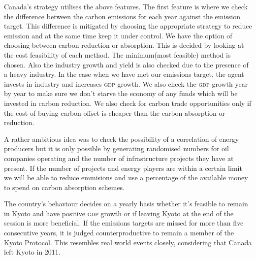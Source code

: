 Canada's strategy utilises the above features. The first feature is where we check the difference between the carbon emissions for each year against the emission target. This difference is mitigated by choosing the appropriate strategy to reduce emission and at the same time keep it under control. We have the option of choosing between carbon reduction or absorption. This is decided by looking at the cost feasibility of each method. The minimum(most feasible) method is chosen. Also the industry growth and yield is also checked due to the presence of a heavy industry. In the case when we have met our emissions target, the agent invests in industry and increases \textsc{gdp} growth. We also check the \textsc{gdp} growth year by year to make sure we don't starve the economy of any funds which will be invested in carbon reduction. We also check for carbon trade opportunities only if the cost of buying carbon offset is cheaper than the carbon absorption or reduction.

A rather ambitious idea was to check the possibility of a correlation of energy producers but it is only possible by generating randomised numbers for oil companies operating and the number of infrastructure projects they have at present. If the number of projects and energy players are within a certain limit we will be able to reduce emmisions and use a percentage of the available money to spend on carbon absorption schemes.

The country's behaviour decides on a yearly basis whether it's feasible to remain in Kyoto and have positive \textsc{gdp} growth or if leaving Kyoto at the end of the session is more beneficial. If the emissions targets are missed for more than five consecutive years, it is judged counterproductive to remain a member of the Kyoto Protocol. This resembles real world events closely, considering that Canada left Kyoto in 2011.
